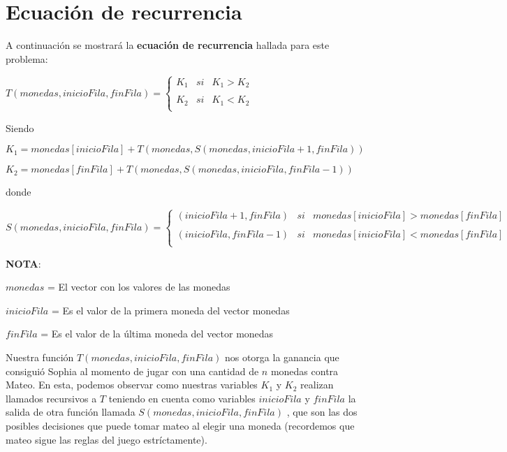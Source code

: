 \section{Ecuación de recurrencia}

A continuación se mostrará la \textbf{ecuación de recurrencia} hallada para este
problema:

\vskip0.5cm

\begin{center}
  
    $T(monedas, inicioFila, finFila) = \left\{ \begin{array}{lcc} K_{1} & si & K_{1} > K_{2} \\ \\ K_{2} & si & K_{1} < K_{2} \\  \end{array} \right.$

\end{center}

Siendo 

\vskip0.25cm

\begin{center}
  
    $K_{1} = monedas[inicioFila] + T(monedas, S(monedas, inicioFila + 1, finFila))$

    \vskip0.1cm
    $K_{2} = monedas[finFila] + T(monedas, S(monedas, inicioFila, finFila - 1))$
\end{center}


donde


$S(monedas, inicioFila, finFila) = \left\{ \begin{array}{lcc} (inicioFila+1,finFila) & si & monedas[inicioFila] > monedas[finFila] \\ \\ (inicioFila, finFila - 1) & si &  monedas[inicioFila] < monedas[finFila] \\  \end{array} \right.$

\vskip0.5cm

\textbf{NOTA}: 

$monedas$ = El vector con los valores de las monedas

$inicioFila$ = Es el valor de la primera moneda del vector monedas

$finFila$ = Es el valor de la última moneda del vector monedas

\vskip0.5cm

Nuestra función $T(monedas, inicioFila, finFila)$ nos otorga la ganancia que consiguió Sophia al momento de jugar con una cantidad de $n$ monedas contra Mateo. En esta, podemos observar como nuestras variables $K_{1}$ y $K_{2}$
realizan llamados recursivos a $T$ teniendo en cuenta como variables $inicioFila$ y $finFila$ la salida de otra función llamada $S(monedas, inicioFila, finFila)$ , que son las dos posibles decisiones que puede tomar mateo al elegir una moneda (recordemos que mateo sigue las reglas del juego estríctamente).